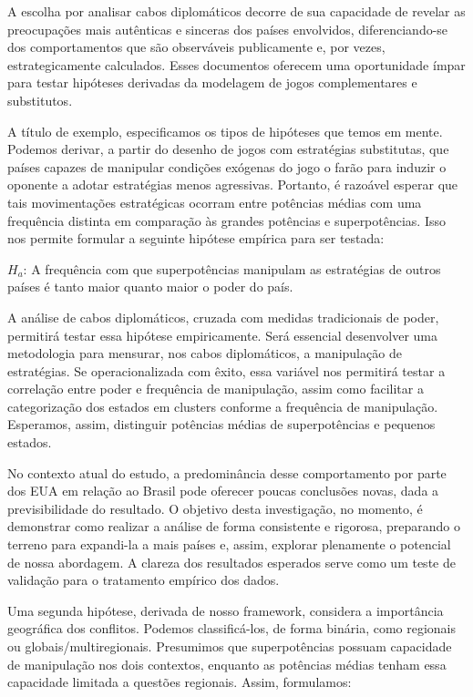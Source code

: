 \documentclass[]{interact}
\theoremstyle{plain}%
\theoremstyle{definition}
\theoremstyle{remark}
\begin{document}
A escolha por analisar cabos diplomáticos decorre de sua capacidade de
revelar as preocupações mais autênticas e sinceras dos países
envolvidos, diferenciando-se dos comportamentos que são observáveis
publicamente e, por vezes, estrategicamente calculados. Esses documentos
oferecem uma oportunidade ímpar para testar hipóteses derivadas da
modelagem de jogos complementares e substitutos.

A título de exemplo, especificamos os tipos de hipóteses que temos em
mente. Podemos derivar, a partir do desenho de jogos com estratégias
substitutas, que países capazes de manipular condições exógenas do jogo
o farão para induzir o oponente a adotar estratégias menos agressivas.
Portanto, é razoável esperar que tais movimentações estratégicas ocorram
entre potências médias com uma frequência distinta em comparação às
grandes potências e superpotências. Isso nos permite formular a seguinte
hipótese empírica para ser testada:

\(H_a\): A frequência com que superpotências manipulam as estratégias de
outros países é tanto maior quanto maior o poder do país.

A análise de cabos diplomáticos, cruzada com medidas tradicionais de
poder, permitirá testar essa hipótese empiricamente. Será essencial
desenvolver uma metodologia para mensurar, nos cabos diplomáticos, a
manipulação de estratégias. Se operacionalizada com êxito, essa variável
nos permitirá testar a correlação entre poder e frequência de
manipulação, assim como facilitar a categorização dos estados em
clusters conforme a frequência de manipulação. Esperamos, assim,
distinguir potências médias de superpotências e pequenos estados.

No contexto atual do estudo, a predominância desse comportamento por
parte dos EUA em relação ao Brasil pode oferecer poucas conclusões
novas, dada a previsibilidade do resultado. O objetivo desta
investigação, no momento, é demonstrar como realizar a análise de forma
consistente e rigorosa, preparando o terreno para expandi-la a mais
países e, assim, explorar plenamente o potencial de nossa abordagem. A
clareza dos resultados esperados serve como um teste de validação para o
tratamento empírico dos dados.

Uma segunda hipótese, derivada de nosso framework, considera a
importância geográfica dos conflitos. Podemos classificá-los, de forma
binária, como regionais ou globais/multiregionais. Presumimos que
superpotências possuam capacidade de manipulação nos dois contextos,
enquanto as potências médias tenham essa capacidade limitada a questões
regionais. Assim, formulamos:
\end{document}
